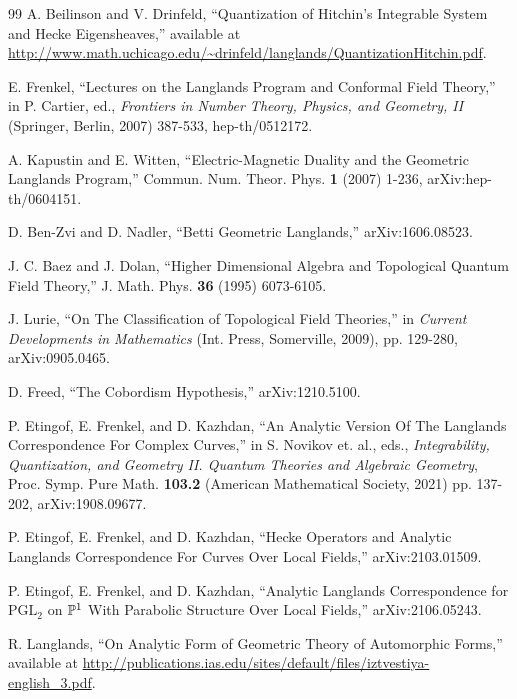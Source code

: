 
\begin{thebibliography}{99}
A. Beilinson and V. Drinfeld, ``Quantization of Hitchin's
Integrable System and Hecke Eigensheaves,''
available at \url{http://www.math.uchicago.edu/~drinfeld/langlands/QuantizationHitchin.pdf}.

E. Frenkel, ``Lectures on the Langlands Program and Conformal Field Theory,'' in P. Cartier, ed., {\it Frontiers in Number Theory,
Physics, and Geometry, II} (Springer, Berlin, 2007) 387-533, hep-th/0512172.

A. Kapustin and E. Witten, 
``Electric-Magnetic Duality and the Geometric Langlands Program,''   Commun. Num. Theor. Phys.
{\bf 1} (2007) 1-236,
arXiv:hep-th/0604151.

 D. Ben-Zvi and D. Nadler, ``Betti Geometric Langlands,'' arXiv:1606.08523.

J. C. Baez and J. Dolan, ``Higher Dimensional Algebra
and Topological Quantum Field Theory,'' J. Math. Phys. {\bf 36} (1995) 6073-6105.

J. Lurie, ``On The Classification of Topological Field Theories,''
in {\it Current Developments in Mathematics} (Int. Press, Somerville, 2009), pp. 129-280, arXiv:0905.0465.

 D. Freed, ``The Cobordism Hypothesis,''  arXiv:1210.5100.

P. Etingof, E. Frenkel, and D. Kazhdan, ``An Analytic Version Of The Langlands Correspondence For Complex Curves,''  in S. Novikov et. al., eds.,
{\it Integrability, Quantization, and Geometry II. Quantum Theories and Algebraic Geometry}, Proc. Symp. Pure Math. {\bf 103.2} (American
Mathematical Society, 2021) pp. 137-202,
arXiv:1908.09677.

P. Etingof, E. Frenkel, and D. Kazhdan, ``Hecke Operators and Analytic Langlands Correspondence For Curves Over Local Fields,''
arXiv:2103.01509.

P. Etingof, E. Frenkel, and D. Kazhdan, ``Analytic Langlands Correspondence for $\mathrm{PGL}_2$ on ${\Bbb P}^1$ With Parabolic
Structure Over Local Fields,'' arXiv:2106.05243.

R. Langlands, ``On Analytic Form of Geometric Theory of Automorphic Forms,'' available at
\url{http://publications.ias.edu/sites/default/files/iztvestiya-english_3.pdf}.



\end{thebibliography}
